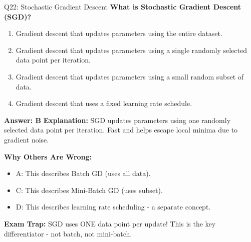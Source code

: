 \documentclass[8pt]{beamer}
\begin{document}
	\begin{frame}{Q22: Stochastic Gradient Descent}
		\fontsize{6.5}{7.5}\selectfont
		\textbf{What is Stochastic Gradient Descent (SGD)?}
		
		\begin{enumerate}
			\item Gradient descent that updates parameters using the entire dataset.
			\item Gradient descent that updates parameters using a single randomly selected data point per iteration.
			\item Gradient descent that updates parameters using a small random subset of data.
			\item Gradient descent that uses a fixed learning rate schedule.
		\end{enumerate}
		
		\vspace{0.05cm}
		\textcolor{myblue}{\textbf{Answer: B}}
		\vspace{0.05cm}
		\textcolor{myblue}{\textbf{Explanation:}} SGD updates parameters using one randomly selected data point per iteration. Fast and helps escape local minima due to gradient noise.
		
		\vspace{0.05cm}
		\textcolor{myred}{\textbf{Why Others Are Wrong:}}
		\begin{itemize}
			\item \textcolor{myred}{A:} This describes Batch GD (uses all data).
			\item \textcolor{myred}{C:} This describes Mini-Batch GD (uses subset).
			\item \textcolor{myred}{D:} This describes learning rate scheduling - a separate concept.
		\end{itemize}
		
		\textcolor{myred}{\textbf{Exam Trap:}} SGD uses \textcolor{myblue}{ONE data point} per update! This is the key differentiator - not batch, not mini-batch.
	\end{frame}
	
\end{document}
